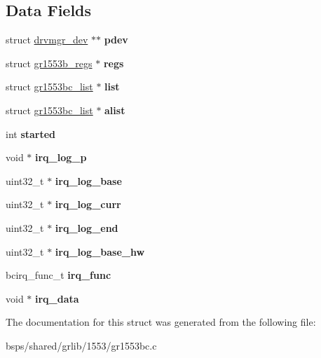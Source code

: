 \subsection*{Data Fields}
\begin{DoxyCompactItemize}
\item 
\mbox{\label{structgr1553bc__priv_aa325b7a460463ddb241e4031903a7a03}} 
struct \mbox{\hyperlink{structdrvmgr__dev}{drvmgr\+\_\+dev}} $\ast$$\ast$ {\bfseries pdev}
\item 
\mbox{\label{structgr1553bc__priv_a3d21b75d18bf026bde3ca6acae13df37}} 
struct \mbox{\hyperlink{structgr1553b__regs}{gr1553b\+\_\+regs}} $\ast$ {\bfseries regs}
\item 
\mbox{\label{structgr1553bc__priv_aac14b7dec3129c34aed7439a130cfc67}} 
struct \mbox{\hyperlink{structgr1553bc__list}{gr1553bc\+\_\+list}} $\ast$ {\bfseries list}
\item 
\mbox{\label{structgr1553bc__priv_aa912c84b684c8ac2c0c6eca2e602604d}} 
struct \mbox{\hyperlink{structgr1553bc__list}{gr1553bc\+\_\+list}} $\ast$ {\bfseries alist}
\item 
\mbox{\label{structgr1553bc__priv_ac498b23f83d333710dec87634170fdfd}} 
int {\bfseries started}
\item 
\mbox{\label{structgr1553bc__priv_ae94822d2f8b1721371f003ee8660b6e4}} 
void $\ast$ {\bfseries irq\+\_\+log\+\_\+p}
\item 
\mbox{\label{structgr1553bc__priv_a750286553d7d27254f37c7750a3021dd}} 
uint32\+\_\+t $\ast$ {\bfseries irq\+\_\+log\+\_\+base}
\item 
\mbox{\label{structgr1553bc__priv_aa907a92bc6b4d50dbfd6241f9c49d68a}} 
uint32\+\_\+t $\ast$ {\bfseries irq\+\_\+log\+\_\+curr}
\item 
\mbox{\label{structgr1553bc__priv_a068bbca6b22abd8bccd988d8df85274d}} 
uint32\+\_\+t $\ast$ {\bfseries irq\+\_\+log\+\_\+end}
\item 
\mbox{\label{structgr1553bc__priv_a0bd67ec8512deaa0415932af9f481544}} 
uint32\+\_\+t $\ast$ {\bfseries irq\+\_\+log\+\_\+base\+\_\+hw}
\item 
\mbox{\label{structgr1553bc__priv_ad1679b79dbd5111d2cecd0383b816093}} 
bcirq\+\_\+func\+\_\+t {\bfseries irq\+\_\+func}
\item 
\mbox{\label{structgr1553bc__priv_a82a06eca188ab5ca947aa2e0a720bab1}} 
void $\ast$ {\bfseries irq\+\_\+data}
\end{DoxyCompactItemize}


The documentation for this struct was generated from the following file\+:\begin{DoxyCompactItemize}
\item 
bsps/shared/grlib/1553/gr1553bc.\+c\end{DoxyCompactItemize}
